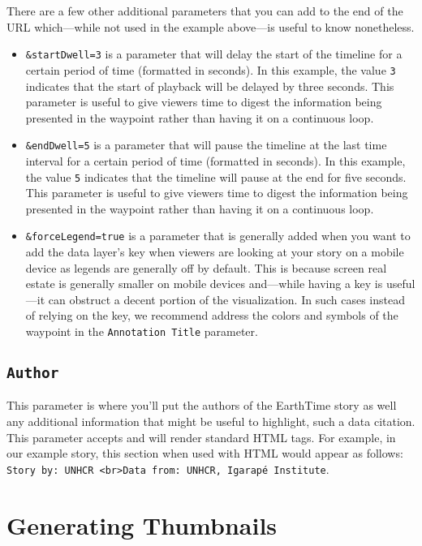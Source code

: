 \documentclass[
]{krantz}
\begin{document}
There are a few other additional parameters that you can add to the end of the URL which---while not used in the example above---is useful to know nonetheless.

\begin{itemize}
\item
  \texttt{\&startDwell=3} is a parameter that will delay the start of the timeline for a certain period of time (formatted in seconds). In this example, the value \texttt{3} indicates that the start of playback will be delayed by three seconds. This parameter is useful to give viewers time to digest the information being presented in the waypoint rather than having it on a continuous loop.
\item
  \texttt{\&endDwell=5} is a parameter that will pause the timeline at the last time interval for a certain period of time (formatted in seconds). In this example, the value \texttt{5} indicates that the timeline will pause at the end for five seconds. This parameter is useful to give viewers time to digest the information being presented in the waypoint rather than having it on a continuous loop.
\item
  \texttt{\&forceLegend=true} is a parameter that is generally added when you want to add the data layer's key when viewers are looking at your story on a mobile device as legends are generally off by default. This is because screen real estate is generally smaller on mobile devices and---while having a key is useful---it can obstruct a decent portion of the visualization. In such cases instead of relying on the key, we recommend address the colors and symbols of the waypoint in the \texttt{Annotation\ Title} parameter.
\end{itemize}

\hypertarget{author}{%
\subsection*{\texorpdfstring{\texttt{Author}}{Author}}\label{author}}


This parameter is where you'll put the authors of the EarthTime story as well any additional information that might be useful to highlight, such a data citation. This parameter accepts and will render standard HTML tags. For example, in our example story, this section when used with HTML would appear as follows: \texttt{Story\ by:\ UNHCR\ \textless{}br\textgreater{}Data\ from:\ UNHCR,\ Igarapé\ Institute}.

\hypertarget{generating-thumbnails}{%
\section{Generating Thumbnails}\label{generating-thumbnails}}
\end{document}
